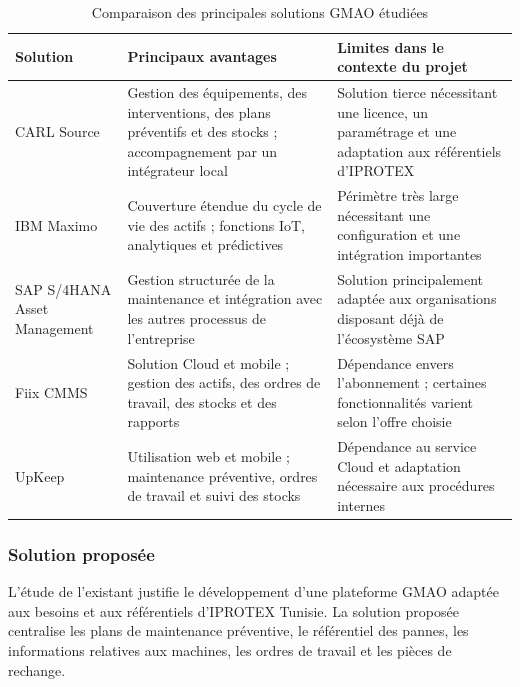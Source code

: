 \begin{table}[H]
\centering
\caption{Comparaison des principales solutions GMAO étudiées}
\label{tab:comparaison-gmao}
\small
\begin{tabularx}{\textwidth}{|p{2.4cm}|X|X|}
\hline
\textbf{Solution} & \textbf{Principaux avantages} & \textbf{Limites dans le contexte du projet} \\
\hline

CARL Source &
Gestion des équipements, des interventions, des plans préventifs et des stocks ; accompagnement par un intégrateur local &
Solution tierce nécessitant une licence, un paramétrage et une adaptation aux référentiels d’IPROTEX \\
\hline

IBM Maximo &
Couverture étendue du cycle de vie des actifs ; fonctions IoT, analytiques et prédictives &
Périmètre très large nécessitant une configuration et une intégration importantes \\
\hline

SAP S/4HANA Asset Management &
Gestion structurée de la maintenance et intégration avec les autres processus de l’entreprise &
Solution principalement adaptée aux organisations disposant déjà de l’écosystème SAP \\
\hline

Fiix CMMS &
Solution Cloud et mobile ; gestion des actifs, des ordres de travail, des stocks et des rapports &
Dépendance envers l’abonnement ; certaines fonctionnalités varient selon l’offre choisie \\
\hline

UpKeep &
Utilisation web et mobile ; maintenance préventive, ordres de travail et suivi des stocks &
Dépendance au service Cloud et adaptation nécessaire aux procédures internes \\
\hline
\end{tabularx}
\end{table}


\subsubsection{Solution proposée}

L’étude de l’existant justifie le développement d’une plateforme GMAO adaptée aux besoins et aux référentiels d’IPROTEX Tunisie. La solution proposée centralise les plans de maintenance préventive, le référentiel des pannes, les informations relatives aux machines, les ordres de travail et les pièces de rechange.

